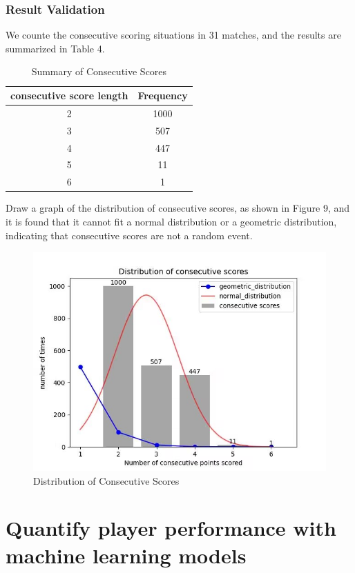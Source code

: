 \documentclass{mcmthesis}
\begin{document}
\subsubsection{Result Validation}
We counte the consecutive scoring situations in 31 matches, and the results are summarized in Table 4.
\begin{table}[]
	\centering
	\begin{tabular}{cc}
		\hline
		\textbf{consecutive score length} & \textbf{Frequency} \\ \hline
		2                       & 1000      \\ \hline
		3                       & 507       \\ \hline
		4                       & 447       \\ \hline
		5                       & 11        \\ \hline
		6                       & 1         \\ \hline
	\end{tabular}
	\caption{Summary of Consecutive Scores}
	\label{tab:my-table}
\end{table}

Draw a graph of the distribution of consecutive scores, as shown in Figure 9, and it is found that it cannot fit a normal distribution or a geometric distribution, indicating that consecutive scores are not a random event.

\begin{figure}[h]
\centering
\includegraphics[width=12cm]{figures/Distribution.jpg}
\caption{Distribution of Consecutive Scores} \label{fig:aa}
\end{figure}


\section{Quantify player performance with machine learning models}
\end{document}
